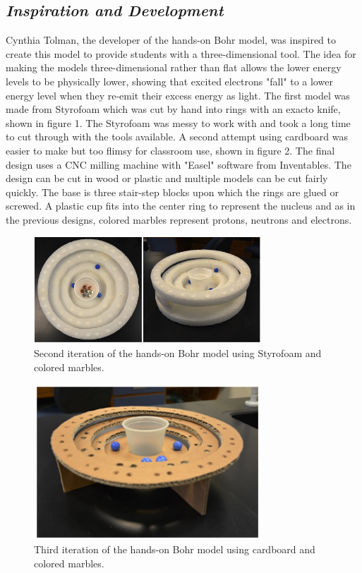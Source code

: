 \documentclass[11pt]{sig-alternate}
\begin{document}
\begin{large}
\section*{\textit{Inspiration and Development}}
Cynthia Tolman, the developer of the hands-on Bohr model, was inspired to create this model to provide students with a three-dimensional tool. The idea for making the models three-dimensional rather than flat allows the lower energy levels to be physically lower, showing that excited electrons "fall" to a lower energy level when they re-emit their excess energy as light.
The first model was made from Styrofoam which was cut by hand into rings with an exacto knife, shown in figure 1.  The Styrofoam was messy to work with and took a long time to cut through with the tools available. A second attempt using cardboard was easier to make but too flimsy for classroom use, shown in figure 2. The final design uses a CNC milling machine with "Easel" software from Inventables. The design can be cut in wood or plastic and multiple models can be cut fairly quickly. The base is three stair-step blocks upon which the rings are glued or screwed. A plastic cup fits into the center ring to represent the nucleus and as in the previous designs, colored marbles represent protons, neutrons and electrons.
     \begin{figure}[htp]
    \leftmargin
    \includegraphics[width=8.5cm]{Figure1.png}
        \caption{Second iteration of the hands-on Bohr model using Styrofoam and colored marbles.}
    \label{hands-on Bohr model using Styrofoam}
    \label{Figure shows 3D Bohr model made of white styrofoam with indentations for colored marbles to be placed. The figure on the left is a top-down view and the figure on the right is a side view.}
\end{figure}

     \begin{figure}[htp]
    \centering
    \includegraphics[width=8.5cm]{Figure2.png}
    \caption{Third iteration of the hands-on Bohr model using cardboard and colored marbles.}
    \label{Figure 2 Third iteration of the hands-on Bohr model using cardboard and colored marbles.}
    \label{}
\end{figure}




\end{large}
\end{document}
